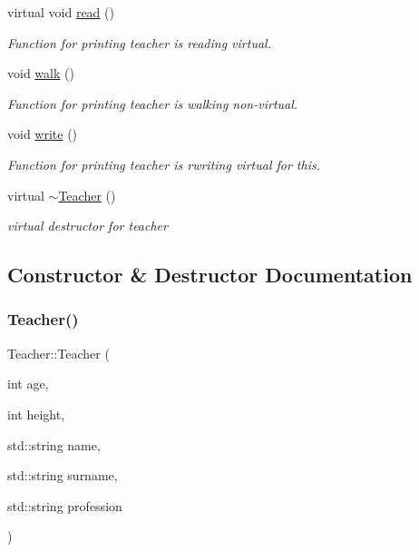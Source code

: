 \begin{DoxyCompactItemize}
\mbox{\label{classTeacher_a64ae9d62ba6d41ebc46e54592a0813f2}} 
virtual void \hyperlink{classTeacher_a64ae9d62ba6d41ebc46e54592a0813f2}{read} ()
\begin{DoxyCompactList}\small\item\em Function for printing teacher is reading virtual. \end{DoxyCompactList}\item 
\mbox{\label{classTeacher_a5a8c7a35488f8477e4de16a82e58a450}} 
void \hyperlink{classTeacher_a5a8c7a35488f8477e4de16a82e58a450}{walk} ()
\begin{DoxyCompactList}\small\item\em Function for printing teacher is walking non-\/virtual. \end{DoxyCompactList}\item 
\mbox{\label{classTeacher_a72fca1f874507510fb8af2ad193a39a3}} 
void \hyperlink{classTeacher_a72fca1f874507510fb8af2ad193a39a3}{write} ()
\begin{DoxyCompactList}\small\item\em Function for printing teacher is rwriting virtual for this. \end{DoxyCompactList}\item 
\mbox{\label{classTeacher_a27e515506e87deffe0cb21e26c4df90c}} 
virtual \hyperlink{classTeacher_a27e515506e87deffe0cb21e26c4df90c}{$\sim$\+Teacher} ()
\begin{DoxyCompactList}\small\item\em virtual destructor for teacher \end{DoxyCompactList}\end{DoxyCompactItemize}


\subsection{Constructor \& Destructor Documentation}
\mbox{\label{classTeacher_aa5505a3ae1de4412c44498498f3a3da3}} 
\subsubsection{\texorpdfstring{Teacher()}{Teacher()}\hspace{0.1cm}{\footnotesize\ttfamily [1/2]}}
{\footnotesize\ttfamily Teacher\+::\+Teacher (\begin{DoxyParamCaption}\item[{int}]{age,  }\item[{int}]{height,  }\item[{std\+::string}]{name,  }\item[{std\+::string}]{surname,  }\item[{std\+::string}]{profession }\end{DoxyParamCaption})}



